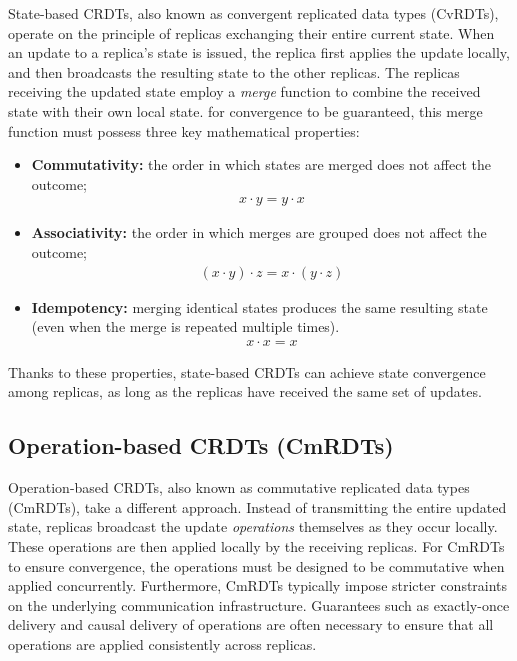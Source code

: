 State-based CRDTs, also known as convergent replicated data types (CvRDTs), operate on the
principle of replicas exchanging their entire current state. When an update to a replica's
state is issued, the replica first applies the update locally, and then broadcasts the
resulting state to the other replicas. The replicas receiving the updated state employ a
\textit{merge} function to combine the received state with their own local state. for
convergence to be guaranteed, this merge function must possess three key mathematical
properties:

\begin{itemize}
    \item \textbf{Commutativity:} the order in which states are merged does not affect the
        outcome;\\
        \begin{equation}
            \begin{aligned} x \cdot y = y \cdot x \end{aligned} 
        \end{equation}
    \item \textbf{Associativity:} the order in which merges are grouped does not affect the
        outcome;\\
        \begin{equation}
            \begin{aligned} (x \cdot y) \cdot z = x \cdot (y \cdot z) \end{aligned}
        \end{equation}
    \item \textbf{Idempotency:} merging identical states produces the same resulting state
        (even when the merge is repeated multiple times).
        \begin{equation}
            \begin{aligned} x \cdot x = x \end{aligned}
        \end{equation}
\end{itemize}

Thanks to these properties, state-based CRDTs can achieve state convergence among replicas,
as long as the replicas have received the same set of updates.

\subsection{Operation-based CRDTs (CmRDTs)}
Operation-based CRDTs, also known as commutative replicated data types (CmRDTs), take a
different approach. Instead of transmitting the entire updated state, replicas broadcast
the update \textit{operations} themselves as they occur locally. These operations are then
applied locally by the receiving replicas. For CmRDTs to ensure convergence, the operations
must be designed to be commutative when applied concurrently. Furthermore, CmRDTs typically
impose stricter constraints on the underlying communication infrastructure. Guarantees such
as exactly-once delivery and causal delivery of operations are often necessary to ensure
that all operations are applied consistently across replicas.

